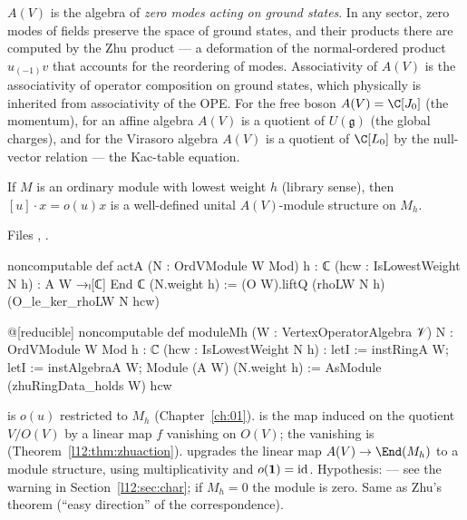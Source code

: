 \begin{physics}
$A(V)$ is the algebra of \emph{zero modes acting on ground states}. In any sector, zero modes of fields preserve
the space of ground states, and their products there are computed by the Zhu product --- a deformation of the
normal-ordered product $u_{(-1)}v$ that accounts for the reordering of modes. Associativity of $A(V)$ is the
associativity of operator composition on ground states, which physically is inherited from associativity of the
OPE. For the free boson $A(V) = \C[J_0]$ (the momentum), for an affine algebra $A(V)$ is a quotient of
$U(\mathfrak g)$ (the global charges), and for the Virasoro algebra $A(V)$ is a quotient of $\C[L_0]$ by the
null-vector relation --- the Kac-table equation.
\end{physics}

\begin{theorem}\label{l12:thm:moduleMh}
If $M$ is an ordinary module with lowest weight $h$ (library sense), then $[u]\cdot x = o(u)x$ is a well-defined
unital $A(V)$-module structure on $M_h$.
\end{theorem}
\noindent Files ,
.
\begin{leancode}
noncomputable def actA (N : OrdVModule W Mod) {h : ℂ} (hcw : IsLowestWeight N h) :
    A W →ₗ[ℂ] End ℂ (N.weight h) :=
  (O W).liftQ (rhoLW N h) (O_le_ker_rhoLW N hcw)

@[reducible] noncomputable def moduleMh (W : VertexOperatorAlgebra 𝒱) {N : OrdVModule W Mod} {h : ℂ}
    (hcw : IsLowestWeight N h) :
    letI := instRingA W; letI := instAlgebraA W; Module (A W) (N.weight h) :=
  AsModule (zhuRingData_holds W) hcw
\end{leancode}

\begin{dictionary}
 is $o(u)$ restricted to $M_h$ (Chapter~\ref{ch:01}).  is the map
induced on the quotient $V/O(V)$ by a linear map $f$ vanishing on $O(V)$; the vanishing is
 (Theorem~\ref{l12:thm:zhuaction}).  upgrades the linear map $A(V)\to\End(M_h)$
to a module structure, using multiplicativity  and $o(\mathbf{1}) = \mathrm{id}$.
Hypothesis:  --- see the warning in Section~\ref{l12:sec:char}; if $M_h = 0$ the module is
zero. Same as Zhu's theorem (``easy direction'' of the correspondence).
\end{dictionary}

